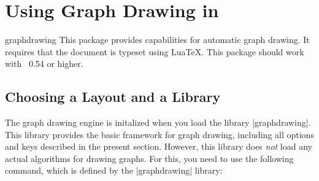 %
%
%


\section{Using Graph Drawing in \tikzname}

{}

\begin{tikzlibrary}{graphdrawing}
  This package provides capabilities for automatic graph drawing. It
  requires that the document is typeset using Lua\TeX. This package
  should work with \LuaTeX\ 0.54 or higher.
\end{tikzlibrary}


\subsection{Choosing a Layout and a Library}

The graph drawing engine is initalized when you load the library
|graphdrawing|. This library provides the basic framework for graph
drawing, including all options and keys described in the present
section. However, this library does \emph{not} load any actual
algorithms for drawing graphs. For this, you need to use the following
command, which is defined by the |graphdrawing| library:

